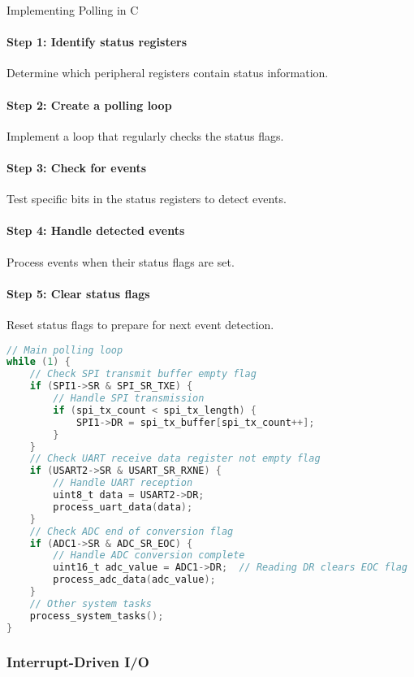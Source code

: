 \begin{KR}{Implementing Polling in C}
\paragraph{Step 1: Identify status registers}
Determine which peripheral registers contain status information.
\paragraph{Step 2: Create a polling loop}
Implement a loop that regularly checks the status flags.
\paragraph{Step 3: Check for events}
Test specific bits in the status registers to detect events.
\paragraph{Step 4: Handle detected events}
Process events when their status flags are set.
\paragraph{Step 5: Clear status flags}
Reset status flags to prepare for next event detection.

\begin{lstlisting}[language=C, style=basesmol]
// Main polling loop
while (1) {
    // Check SPI transmit buffer empty flag
    if (SPI1->SR & SPI_SR_TXE) {
        // Handle SPI transmission
        if (spi_tx_count < spi_tx_length) {
            SPI1->DR = spi_tx_buffer[spi_tx_count++];
        }
    }
    // Check UART receive data register not empty flag
    if (USART2->SR & USART_SR_RXNE) {
        // Handle UART reception
        uint8_t data = USART2->DR;
        process_uart_data(data);
    }
    // Check ADC end of conversion flag
    if (ADC1->SR & ADC_SR_EOC) {
        // Handle ADC conversion complete
        uint16_t adc_value = ADC1->DR;  // Reading DR clears EOC flag
        process_adc_data(adc_value);
    }
    // Other system tasks
    process_system_tasks();
}
\end{lstlisting}
\end{KR}

\raggedcolumns
\columnbreak

\subsubsection{Interrupt-Driven I/O}

